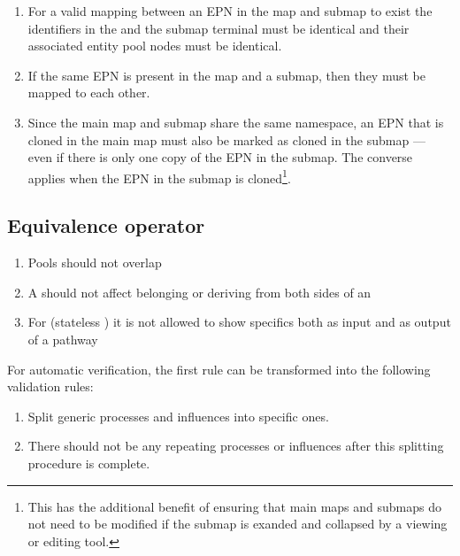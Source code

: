 \begin{enumerate}
\item For a valid mapping between an EPN in the map and submap to exist the identifiers in the  and the submap terminal must be identical and their associated entity pool nodes must be identical.
\item If the same EPN is present in the map and a submap, then they must be mapped to each other.
\item Since the main map and submap share the same namespace, an EPN that is cloned in the main map must also be
marked as cloned in the submap --- even if there is only one copy of the EPN in the submap. The converse applies when the EPN in the submap is cloned\footnote{This has the additional benefit of ensuring that main maps and submaps do not need to be modified if the submap is exanded and collapsed by a viewing or editing tool.}.
\end{enumerate}

\subsection{Equivalence operator}
\label{sec:eq-semantics}

\begin{enumerate}
    \item Pools should not overlap
    \item A  should not affect  belonging or deriving from both sides of an 
    \item For  (stateless ) it is not allowed to show specifics both as input and as output of a pathway
\end{enumerate}

For automatic verification, the first rule can be transformed into the following validation rules:
\begin{enumerate}[label=(\alph*)]
    \item Split generic processes and influences into specific ones.
    \item There should not be any repeating processes or influences after this splitting procedure is complete.
\end{enumerate}


